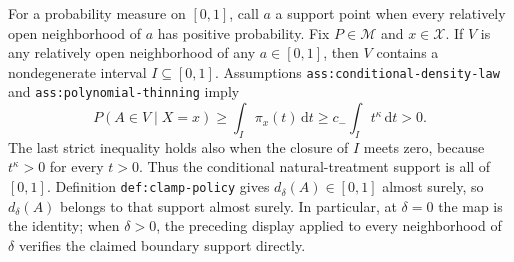 For a probability measure on \([0,1]\), call \(a\) a support point when every relatively open neighborhood of \(a\) has positive probability.  Fix \(P\in\mathcal M\) and \(x\in\mathcal X\).  If \(V\) is any relatively open neighborhood of any \(a\in[0,1]\), then \(V\) contains a nondegenerate interval \(I\subseteq[0,1]\).  Assumptions \texttt{ass:conditional-density-law} and \texttt{ass:polynomial-thinning} imply
\[
 P(A\in V\mid X=x)
 \geq \int_I\pi_x(t)\,\mathrm dt
 \geq c_-\int_I t^\kappa\,\mathrm dt>0.
\]
The last strict inequality holds also when the closure of \(I\) meets zero, because \(t^\kappa>0\) for every \(t>0\).  Thus the conditional natural-treatment support is all of \([0,1]\).  Definition \texttt{def:clamp-policy} gives \(d_\delta(A)\in[0,1]\) almost surely, so \(d_\delta(A)\) belongs to that support almost surely.  In particular, at \(\delta=0\) the map is the identity; when \(\delta>0\), the preceding display applied to every neighborhood of \(\delta\) verifies the claimed boundary support directly.